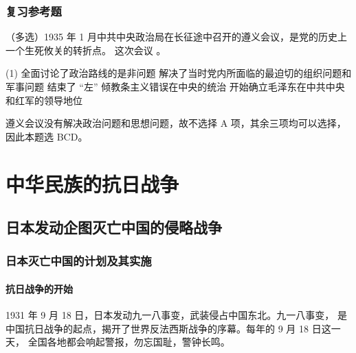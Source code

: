 \documentclass[10pt, UTF8]{book} %
\begin{document}
\subsection{复习参考题}

\begin{example}
    （多选）1935 年 1 月中共中央政治局在长征途中召开的遵义会议，是党的历史上一个生死攸关的转折点。
    这次会议 \underline{\qquad \qquad \qquad}。
    \begin{tasks}[label={\Alph*. }](1)
        \task 全面讨论了政治路线的是非问题
        \task 解决了当时党内所面临的最迫切的组织问题和军事问题
        \task 结束了 “左” 倾教条主义错误在中央的统治
        \task 开始确立毛泽东在中共中央和红军的领导地位
    \end{tasks}
    \begin{sol}
        遵义会议没有解决政治问题和思想问题，故不选择 A 项，其余三项均可以选择，
        因此本题选 BCD。
    \end{sol}
\end{example}


\newpage
\thispagestyle{empty}

\chapter{中华民族的抗日战争}

\section{日本发动企图灭亡中国的侵略战争}

\subsection{日本灭亡中国的计划及其实施}

\subsubsection{抗日战争的开始}

1931 年 9 月 18 日，日本发动九一八事变，武装侵占中国东北。九一八事变，
是中国抗日战争的起点，揭开了世界反法西斯战争的序幕。每年的 9 月 18 日这一天，
全国各地都会响起警报，勿忘国耻，警钟长鸣。
\end{document}
